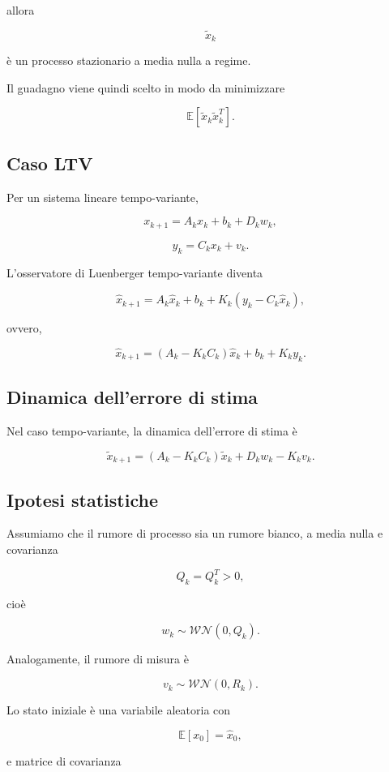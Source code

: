 \documentclass[11pt,a4paper]{article}
\begin{document}
allora

\[
\tilde{x}_k
\]

è un processo stazionario a media nulla a regime.

Il guadagno viene quindi scelto in modo da minimizzare

\[
\boxed{
\mathbb{E}
\!\left[
\tilde{x}_k\tilde{x}_k^{T}
\right].
}
\]

\subsection*{Caso LTV}

Per un sistema lineare tempo-variante,

\[
x_{k+1}
=
A_kx_k
+
b_k
+
D_kw_k,
\]

\[
y_k
=
C_kx_k
+
v_k.
\]

L'osservatore di Luenberger tempo-variante diventa

\[
\hat{x}_{k+1}
=
A_k\hat{x}_k
+
b_k
+
K_k\!\left(y_k-C_k\hat{x}_k\right),
\]

ovvero,

\[
\boxed{
\hat{x}_{k+1}
=
(A_k-K_kC_k)\hat{x}_k
+
b_k
+
K_ky_k.
}
\]

\subsection*{Dinamica dell'errore di stima}

Nel caso tempo-variante, la dinamica dell'errore di stima è

\[
\boxed{
\tilde{x}_{k+1}
=
(A_k-K_kC_k)\tilde{x}_k
+
D_kw_k
-
K_kv_k.
}
\]

\subsection*{Ipotesi statistiche}

Assumiamo che il rumore di processo sia un rumore bianco, a media nulla e covarianza

\[
Q_k=Q_k^T>0,
\]

cioè

\[
w_k\sim\mathcal{WN}(0,Q_k).
\]

Analogamente, il rumore di misura è

\[
v_k\sim\mathcal{WN}(0,R_k).
\]

Lo stato iniziale è una variabile aleatoria con

\[
\mathbb{E}[x_0]=\hat{x}_0,
\]

e matrice di covarianza
\end{document}
